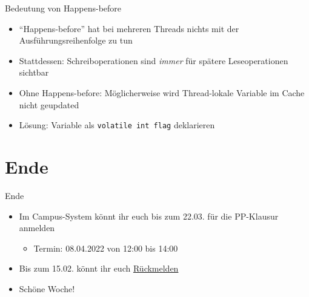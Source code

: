 \documentclass{beamer}
\newcommand{\code}[1]{
	\begin{mdframed}
		
	\end{mdframed}
}
\begin{document}
\begin{frame}{Bedeutung von Happens-before}
  \code{code/happens-before2.java}

  {\small
  \begin{itemize}
    \item \enquote{Happens-before} hat bei mehreren Threads nichts mit der Ausführungsreihenfolge zu tun
    \item Stattdessen: Schreiboperationen sind \emph{immer} für spätere Leseoperationen sichtbar
    \item Ohne Happens-before: Möglicherweise wird Thread-lokale Variable im Cache nicht geupdated
    \item Lösung: Variable als \texttt{volatile int flag} deklarieren
  \end{itemize}
  }
\end{frame}

\section{Ende}

\begin{frame}{Ende}
	\begin{itemize}
		\item Im Campus-System könnt ihr euch bis zum 22.03. für die PP-Klausur anmelden
                \begin{itemize}
                  \item Termin: 08.04.2022 von 12:00 bis 14:00
                \end{itemize}
		\item Bis zum 15.02. könnt ihr euch \href{https://campus.studium.kit.edu/renewal/payment.php}{Rückmelden}
		\item Schöne Woche!
	\end{itemize}
\end{frame}
\end{document}
